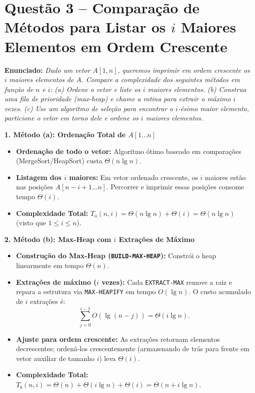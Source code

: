 \documentclass[10pt,a4paper]{article}
\newcommand{\res}[1]{\par\smallskip\centerline{\fbox{\bfseries\strut #1}}\par\smallskip}
\newcommand{\topico}[1]{\smallskip\noindent\textbf{\color{azul}#1}\par}
\newcommand{\questao}[2]{\section*{\large\color{azul}Questão #1 -- #2}\vspace{-4pt}}
\begin{document}
\res{O $3^\circ$ menor elemento retornado é: \boxed{3}}

\clearpage
\questao{3}{Comparação de Métodos para Listar os $i$ Maiores Elementos em Ordem Crescente}

\textbf{Enunciado:} \textit{Dado um vetor $A[1, n]$, queremos imprimir em ordem crescente os $i$ maiores elementos de $A$. Compare a complexidade dos seguintes métodos em função de $n$ e $i$:}
\textit{(a) Ordene o vetor e liste os $i$ maiores elementos.}
\textit{(b) Construa uma fila de prioridade (max-heap) e chame a rotina para extrair o máximo $i$ vezes.}
\textit{(c) Use um algoritmo de seleção para encontrar o $i$-ésimo maior elemento, particione o vetor em torno dele e ordene os $i$ maiores elementos.}

\topico{1. Método (a): Ordenação Total de $A[1 \dots n]$}
\begin{itemize}
    \setlength{\itemsep}{1pt}
    \item \textbf{Ordenação de todo o vetor:} Algoritmo ótimo baseado em comparações (MergeSort/HeapSort) custa $\Theta(n \lg n)$.
    \item \textbf{Listagem dos $i$ maiores:} Em vetor ordenado crescente, os $i$ maiores estão nas posições $A[n - i + 1 \dots n]$. Percorrer e imprimir essas posições consome tempo $\Theta(i)$.
    \item \textbf{Complexidade Total:} $T_a(n, i) = \Theta(n \lg n) + \Theta(i) = \Theta(n \lg n)$ (visto que $1 \le i \le n$).
\end{itemize}

\topico{2. Método (b): Max-Heap com $i$ Extrações de Máximo}
\begin{itemize}
    \setlength{\itemsep}{1pt}
    \item \textbf{Construção do Max-Heap (\texttt{BUILD-MAX-HEAP}):} Constrói o heap linearmente em tempo $\Theta(n)$.
    \item \textbf{Extrações de máximo ($i$ vezes):} Cada \texttt{EXTRACT-MAX} remove a raiz e repara a estrutura via \texttt{MAX-HEAPIFY} em tempo $O(\lg n)$. O custo acumulado de $i$ extrações é:
    \[
    \sum_{j=0}^{i-1} O(\lg(n - j)) = \Theta(i \lg n).
    \]
    \item \textbf{Ajuste para ordem crescente:} As extrações retornam elementos decrescentes; ordená-los crescentemente (armazenando de trás para frente em vetor auxiliar de tamanho $i$) leva $\Theta(i)$.
    \item \textbf{Complexidade Total:} $T_b(n, i) = \Theta(n) + \Theta(i \lg n) + \Theta(i) = \Theta(n + i \lg n)$.
\end{itemize}
\end{document}
